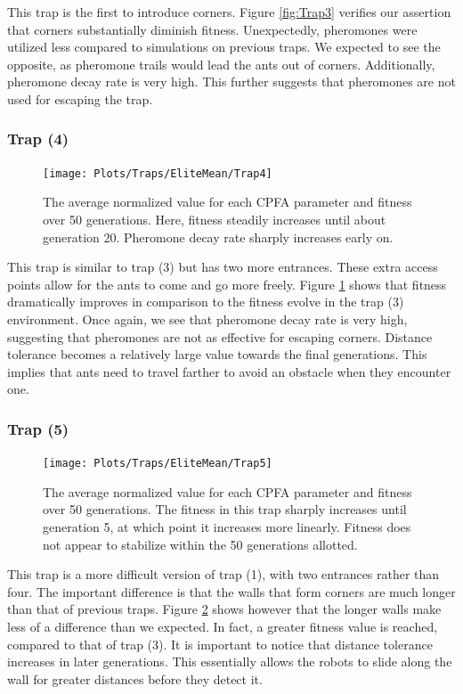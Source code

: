 \documentclass{acm_proc_article-sp}
\begin{document}
This trap is the first to introduce corners. Figure \ref{fig:Trap3} verifies our assertion that corners substantially diminish fitness. Unexpectedly, pheromones were utilized less compared to simulations on previous traps. We expected to see the opposite, as pheromone trails would lead the ants out of corners. Additionally, pheromone decay rate is very high. This further suggests that pheromones are not used for escaping the trap.

\subsubsection{Trap (4)}

\begin{figure}[h]
\texttt{[image: Plots/Traps/EliteMean/Trap4]}
\caption{The average normalized value for each CPFA parameter and fitness over 50 generations. Here, fitness steadily increases until about generation 20. Pheromone decay rate sharply increases early on.} \label{fig:Trap4}
\end{figure}

This trap is similar to trap (3) but has two more entrances. These extra access points allow for the ants to come and go more freely. Figure \ref{fig:Trap4} shows that fitness dramatically improves in comparison to the fitness evolve in the trap (3) environment. Once again, we see that pheromone decay rate is very high, suggesting that pheromones are not as effective for escaping corners. Distance tolerance becomes a relatively large value towards the final generations. This implies that ants need to travel farther to avoid an obstacle when they encounter one.

\subsubsection{Trap (5)}

\begin{figure}[h]
\texttt{[image: Plots/Traps/EliteMean/Trap5]}
\caption{The average normalized value for each CPFA parameter and fitness over 50 generations. The fitness in this trap sharply increases until generation 5, at which point it increases more linearly. Fitness does not appear to stabilize within the 50 generations allotted.} \label{fig:Trap5}
\end{figure}

This trap is a more difficult version of trap (1), with two entrances rather than four. The important difference is that the walls that form corners are much longer than that of previous traps. Figure \ref{fig:Trap5} shows however that the longer walls make less of a difference than we expected. In fact, a greater fitness value is reached, compared to that of trap (3). It is important to notice that distance tolerance increases in later generations. This essentially allows the robots to slide along the wall for greater distances before they detect it.
\end{document}
